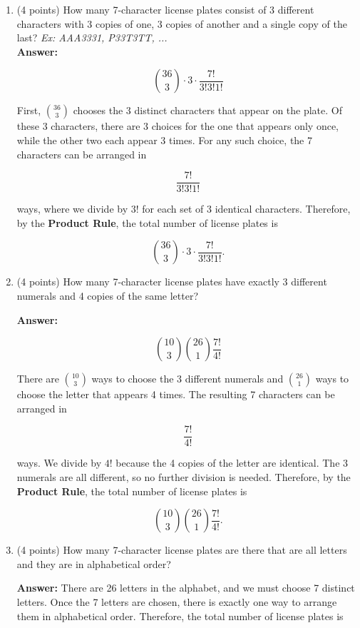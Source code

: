 \documentclass[10pt,letterpaper,unboxed,cm]{article}
\begin{document}
\begin{enumerate}
\begin{enumerate}
Once its position is chosen, the remaining 2 positions can each contain
any of the 36 possible characters. By the \textbf{Product Rule}, there
are
\[
36^2
\]
ways to fill these positions. Since there are 3 possible placements of
\texttt{MILES}, the total number of license plates is
\[
\boxed{3(36^2)}.
\]

\item
(4 points)
How many 7-character license plates consist of 3 different characters with 3 copies of one, 3 copies of another and a single copy of the last?
\emph{Ex: AAA3331, P33T3TT, ...}\\
\textbf{Answer:}

\[
\binom{36}{3}\cdot 3\cdot\frac{7!}{3!3!1!}
\]

First, $\binom{36}{3}$ chooses the 3 distinct characters that appear
on the plate. Of these 3 characters, there are 3 choices for the one
that appears only once, while the other two each appear 3 times.
For any such choice, the 7 characters can be arranged in

\[
\frac{7!}{3!3!1!}
\]

ways, where we divide by $3!$ for each set of 3 identical characters.
Therefore, by the \textbf{Product Rule}, the total number of license
plates is

\[
\boxed{\binom{36}{3}\cdot 3\cdot\frac{7!}{3!3!1!}}.
\]
\item
(4 points)
How many 7-character license plates have exactly 3 different numerals and 4 copies of the same letter?

\textbf{Answer:}

\[
\binom{10}{3}\binom{26}{1}\frac{7!}{4!}
\]

There are $\binom{10}{3}$ ways to choose the 3 different numerals and
$\binom{26}{1}$ ways to choose the letter that appears 4 times.
The resulting 7 characters can be arranged in

\[
\frac{7!}{4!}
\]

ways. We divide by $4!$ because the 4 copies of the letter are
identical. The 3 numerals are all different, so no further division
is needed.
Therefore, by the \textbf{Product Rule}, the total number of license
plates is

\[
\boxed{\binom{10}{3}\binom{26}{1}\frac{7!}{4!}}.
\]
\item
(4 points)
How many 7-character license plates are there that are all letters and they are in alphabetical order?

\textbf{Answer:} There are 26 letters in the alphabet, and we must choose 7 distinct letters.
Once the 7 letters are chosen, there is exactly one way to arrange them in
alphabetical order. Therefore, the total number of license plates is


\end{enumerate}
\end{enumerate}
\end{document}
